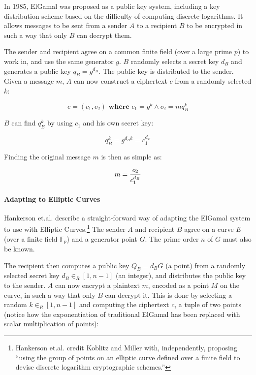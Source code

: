 \label{sec:math_encryption_elgamal}

In 1985, ElGamal was proposed as a public key system, including a key distribution scheme based
on the difficulty of computing discrete logarithms. It allows messages to be sent from a sender
\(A\) to a recipient \(B\) to be encrypted in such a way that only \(B\) can decrypt them.

The sender and recipient agree on a common finite field (over a large prime \(p\)) to work in,
and use the same generator \(g\). \(B\) randomly selects a secret key \(d_B\) and generates a
public key \(q_B = g^{d_B}\). The public key is distributed to the sender. Given a message \(m\),
\(A\) can now construct a ciphertext \(c\) from a randomly selected \(k\):\cite{elgamal}

\begin{equation}
	c = (c_1, c_2)  \textbf{ where }  c_1 = g^k \land c_2 = m q_B^k
\end{equation}

\(B\) can find \(q_B^k\) by using \(c_1\) and his own secret key:

\begin{equation}
	q_B^k = g^{d_B k} = c_1^{d_B}
\end{equation}

Finding the original message \(m\) is then as simple as:

\begin{equation}
    m = {c_2 \over c_1^{d_B}}
\end{equation}

\paragraph{Adapting to Elliptic Curves}
Hankerson et.al. describe a straight-forward way of adapting the ElGamal system to use with
Elliptic Curves.\footnote{Hankerson et.al. credit Koblitz and Miller with, independently, proposing
``using the group of points on an elliptic curve defined over a finite field to devise discrete
logarithm cryptographic schemes.''\cite{hankerson2010}} The sender \(A\) and recipient \(B\) agree on a curve \(E\)
(over a finite field \(\mathbb{F}_p\)) and a generator point \(G\). The prime order \(n\) of \(G\) must also be
known.

The recipient then computes a public key \(Q_B = d_B G\) (a point) from a randomly selected secret key
\(d_B \in_R [1,n-1]\) (an integer), and distributes the public key to the sender. \(A\) can now encrypt
a plaintext \(m\), encoded as a point \(M\) on the curve, in such a way that only \(B\) can decrypt
it. This is done by selecting a random \(k \in_R [1,n-1]\) and computing the ciphertext \(c\), a
tuple of two points (notice how the exponentiation of traditional ElGamal has been replaced with scalar
multiplication of points):

